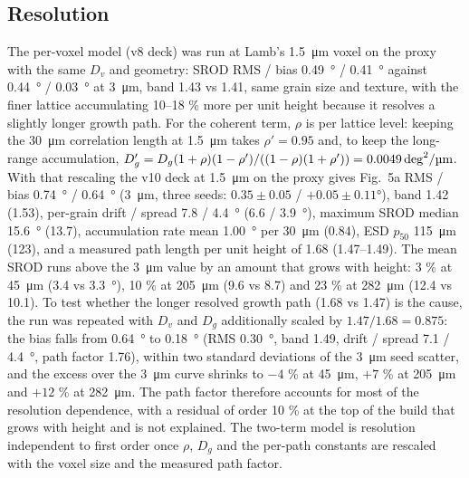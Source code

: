 \documentclass[11pt,a4paper]{article}
\newcommand{\Dunit}{\si{deg\squared\per\micro\metre}}
\begin{document}
\subsection{Resolution}
\label{sec:res}
The per-voxel model (v8 deck) was run at Lamb's \SI{1.5}{\micro\metre} voxel on the proxy with the same $D_v$ and geometry: SROD RMS / bias \SI{0.49}{\degree} / \SI{+0.41}{\degree} against \SI{0.44}{\degree} / \SI{+0.03}{\degree} at \SI{3}{\micro\metre}, band 1.43 vs 1.41, same grain size and texture, with the finer lattice accumulating 10--18 \% more per unit height because it resolves a slightly longer growth path. For the coherent term, $\rho$ is per lattice level: keeping the \SI{30}{\micro\metre} correlation length at \SI{1.5}{\micro\metre} takes $\rho' = 0.95$ and, to keep the long-range accumulation, $D_g' = D_g (1+\rho)(1-\rho')/((1-\rho)(1+\rho')) = \SI{0.0049}{\Dunit}$. With that rescaling the v10 deck at \SI{1.5}{\micro\metre} on the proxy gives Fig.~5a RMS / bias \SI{0.74}{\degree} / \SI{+0.64}{\degree} (\SI{3}{\micro\metre}, three seeds: $0.35 \pm 0.05$ / $+0.05 \pm 0.11$\si{\degree}), band 1.42 (1.53), per-grain drift / spread 7.8 / \SI{4.4}{\degree} (6.6 / \SI{3.9}{\degree}), maximum SROD median \SI{15.6}{\degree} (13.7), accumulation rate mean \SI{1.00}{\degree} per \SI{30}{\micro\metre} (0.84), ESD $p_{50}$ \SI{115}{\micro\metre} (123), and a measured path length per unit height of 1.68 (1.47--1.49). The mean SROD runs above the \SI{3}{\micro\metre} value by an amount that grows with height: 3 \% at \SI{45}{\micro\metre} (3.4 vs \SI{3.3}{\degree}), 10 \% at \SI{205}{\micro\metre} (9.6 vs 8.7) and 23 \% at \SI{282}{\micro\metre} (12.4 vs 10.1). To test whether the longer resolved growth path (1.68 vs 1.47) is the cause, the run was repeated with $D_v$ and $D_g$ additionally scaled by $1.47/1.68 = 0.875$: the bias falls from \SI{+0.64}{\degree} to \SI{+0.18}{\degree} (RMS \SI{0.30}{\degree}, band 1.49, drift / spread 7.1 / \SI{4.4}{\degree}, path factor 1.76), within two standard deviations of the \SI{3}{\micro\metre} seed scatter, and the excess over the \SI{3}{\micro\metre} curve shrinks to $-4$ \% at \SI{45}{\micro\metre}, $+7$ \% at \SI{205}{\micro\metre} and $+12$ \% at \SI{282}{\micro\metre}. The path factor therefore accounts for most of the resolution dependence, with a residual of order 10 \% at the top of the build that grows with height and is not explained. The two-term model is resolution independent to first order once $\rho$, $D_g$ and the per-path constants are rescaled with the voxel size and the measured path factor.
\end{document}
